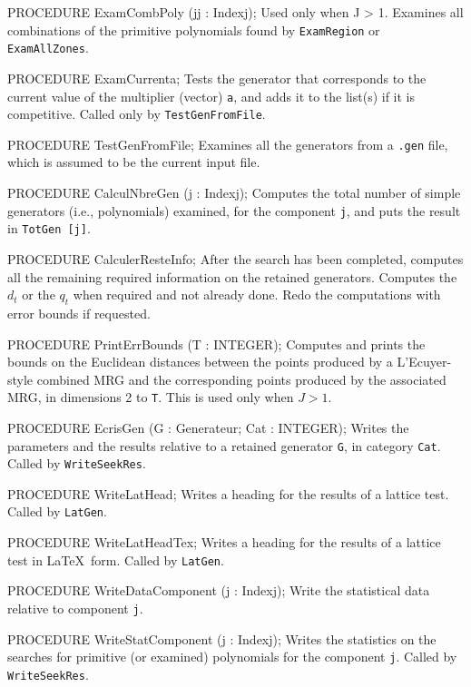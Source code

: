 PROCEDURE ExamCombPoly (jj : Indexj);
\endcode
 \tab
  Used only when J > 1.  Examines all combinations of the primitive
  polynomials found by {\tt ExamRegion} or {\tt ExamAllZones}.
 \endtab 
\code

PROCEDURE ExamCurrenta;
\endcode
 \tab
  Tests the generator that corresponds to the current value of the
  multiplier (vector) {\tt a}, and adds it to the list(s) if it is competitive.
  Called only by {\tt TestGenFromFile}.
 \endtab
\code

PROCEDURE TestGenFromFile;
\endcode
 \tab
  Examines all the generators from a {\tt .gen} file,
  which is assumed to be the current input file.
 \endtab
\code

PROCEDURE CalculNbreGen (j : Indexj);
\endcode
 \tab
  Computes the total number of simple generators (i.e., polynomials)
  examined, for the component {\tt j}, and puts the result in
  {\tt TotGen [j]}.
 \endtab
\code

PROCEDURE CalculerResteInfo;
\endcode
 \tab 
  After the search has been completed, computes all the remaining required
  information on the retained generators.
  Computes the $d_t$ or the $q_t$ when required and not already done.
  Redo the computations with error bounds if requested.
 \endtab
\code

PROCEDURE PrintErrBounds (T : INTEGER);
\endcode
 \tab
  Computes and prints the bounds on the Euclidean distances between
  the points produced by a L'Ecuyer-style combined MRG and the 
  corresponding points produced by the associated MRG,
  in dimensions 2 to {\tt T}.  This is used only when $J > 1$.
 \endtab
\code

PROCEDURE EcrisGen (G : Generateur;    Cat : INTEGER);
\endcode
 \tab
  Writes the parameters and the results relative to a retained 
  generator {\tt G}, in category {\tt Cat}.
  Called by {\tt WriteSeekRes}.
 \endtab
\code

PROCEDURE WriteLatHead;
\endcode
 \tab
  Writes a heading for the results of a lattice test.
  Called by {\tt LatGen}.
 \endtab
\code

PROCEDURE WriteLatHeadTex;
\endcode
 \tab
  Writes a heading for the results of a lattice test in \LaTeX\ form.
  Called by {\tt LatGen}.
 \endtab
\code

PROCEDURE WriteDataComponent (j : Indexj);
\endcode
 \tab
  Write the statistical data relative to component {\tt j}.
 \endtab
\code

PROCEDURE WriteStatComponent (j : Indexj);
\endcode
 \tab
   Writes the statistics on the searches for primitive 
   (or examined) polynomials for the component {\tt j}.
   Called by {\tt WriteSeekRes}.
 \endtab
\code

